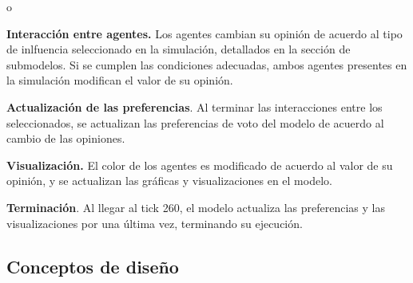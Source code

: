 o \documentclass[11pt, letterpaper]{article}
\begin{document}
\textbf{Interacción entre agentes.} Los agentes cambian su opinión de
acuerdo al tipo de inlfuencia seleccionado en la simulación, detallados
en la sección de submodelos. Si se cumplen las condiciones adecuadas,
ambos agentes presentes en la simulación modifican el valor de su
opinión.

\textbf{Actualización de las preferencias}. Al terminar las
interacciones entre los seleccionados, se actualizan las preferencias de
voto del modelo de acuerdo al cambio de las opiniones.

\textbf{Visualización.} El color de los agentes es modificado de acuerdo
al valor de su opinión, y se actualizan las gráficas y visualizaciones
en el modelo.

\textbf{Terminación}. Al llegar al tick 260, el modelo actualiza las
preferencias y las visualizaciones por una última vez, terminando su
ejecución.

\subsection{Conceptos de diseño}\label{conceptos-de-diseuxf1o}
\end{document}

